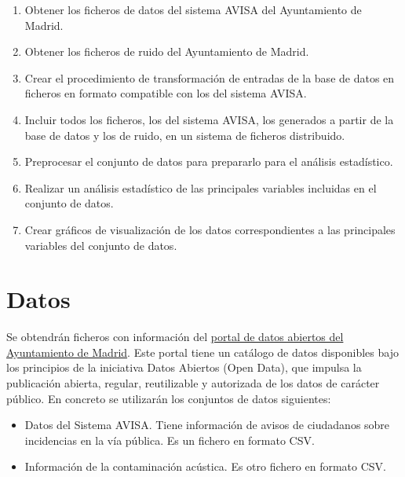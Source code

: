 \documentclass[
  a4paper,
]{scrreport}
\providecommand{\tightlist}{%
  \setlength{\itemsep}{0pt}\setlength{\parskip}{0pt}}\usepackage{longtable,booktabs,array}
\begin{document}
\begin{enumerate}
\def\labelenumi{\arabic{enumi}.}
\tightlist
\item
  Obtener los ficheros de datos del sistema AVISA del Ayuntamiento de
  Madrid.
\item
  Obtener los ficheros de ruido del Ayuntamiento de Madrid.
\item
  Crear el procedimiento de transformación de entradas de la base de
  datos en ficheros en formato compatible con los del sistema AVISA.
\item
  Incluir todos los ficheros, los del sistema AVISA, los generados a
  partir de la base de datos y los de ruido, en un sistema de ficheros
  distribuido.
\item
  Preprocesar el conjunto de datos para prepararlo para el análisis
  estadístico.
\item
  Realizar un análisis estadístico de las principales variables
  incluidas en el conjunto de datos.
\item
  Crear gráficos de visualización de los datos correspondientes a las
  principales variables del conjunto de datos.
\end{enumerate}

\section{Datos}\label{datos}

Se obtendrán ficheros con información del
\href{http://datos.madrid.es/portal/site/egob}{portal de datos abiertos
del Ayuntamiento de Madrid}. Este portal tiene un catálogo de datos
disponibles bajo los principios de la iniciativa Datos Abiertos (Open
Data), que impulsa la publicación abierta, regular, reutilizable y
autorizada de los datos de carácter público. En concreto se utilizarán
los conjuntos de datos siguientes:

\begin{itemize}
\tightlist
\item
  Datos del Sistema AVISA. Tiene información de avisos de ciudadanos
  sobre incidencias en la vía pública. Es un fichero en formato CSV.
\item
  Información de la contaminación acústica. Es otro fichero en formato
  CSV.
\end{itemize}
\end{document}

